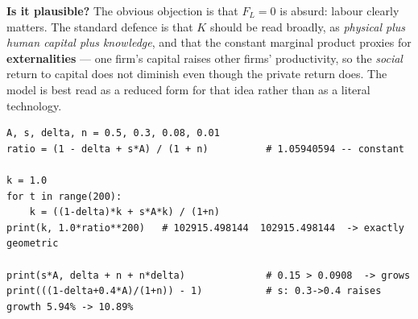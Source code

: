 \documentclass[12pt, letterpaper]{article}
\begin{document}
\begin{tcolorbox}[evenbox,title={Problem 4.4 \quad An AK Model}]
\begin{enumerate}
\textbf{Is it plausible?} The obvious objection is that $F_L = 0$ is absurd: labour clearly
matters. The standard defence is that $K$ should be read broadly, as \emph{physical plus
human capital plus knowledge}, and that the constant marginal product proxies for
\textbf{externalities} --- one firm's capital raises other firms' productivity, so the
\emph{social} return to capital does not diminish even though the private return does. The
model is best read as a reduced form for that idea rather than as a literal technology.

\end{enumerate}

\begin{tcolorbox}[theorybox,title={Verification code (executed)}]
\footnotesize
\begin{verbatim}
A, s, delta, n = 0.5, 0.3, 0.08, 0.01
ratio = (1 - delta + s*A) / (1 + n)          # 1.05940594 -- constant

k = 1.0
for t in range(200):
    k = ((1-delta)*k + s*A*k) / (1+n)
print(k, 1.0*ratio**200)   # 102915.498144  102915.498144  -> exactly geometric

print(s*A, delta + n + n*delta)              # 0.15 > 0.0908  -> grows
print(((1-delta+0.4*A)/(1+n)) - 1)           # s: 0.3->0.4 raises growth 5.94% -> 10.89%
\end{verbatim}
\end{tcolorbox}
\end{tcolorbox}
\end{document}
